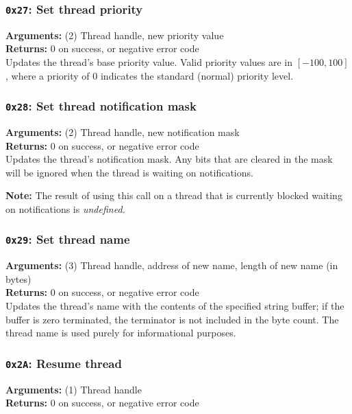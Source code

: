 \documentclass[11pt]{article}
\begin{document}
\subsubsection{{\tt 0x27}: Set thread priority}
\textbf{Arguments:} (2) Thread handle, new priority value \\
\textbf{Returns:} 0 on success, or negative error code \\

Updates the thread's base priority value. Valid priority values are in $[-100, 100]$, where a priority of $0$ indicates the standard (normal) priority level.

\subsubsection{{\tt 0x28}: Set thread notification mask}
\textbf{Arguments:} (2) Thread handle, new notification mask \\
\textbf{Returns:} 0 on success, or negative error code \\

Updates the thread's notification mask. Any bits that are cleared in the mask will be ignored when the thread is waiting on notifications.

\textbf{Note:} The result of using this call on a thread that is currently blocked waiting on notifications is \textit{undefined.}

\subsubsection{{\tt 0x29}: Set thread name}
\textbf{Arguments:} (3) Thread handle, address of new name, length of new name (in bytes) \\
\textbf{Returns:} 0 on success, or negative error code \\

Updates the thread's name with the contents of the specified string buffer; if the buffer is zero terminated, the terminator is not included in the byte count. The thread name is used purely for informational purposes. 

\subsubsection{{\tt 0x2A}: Resume thread}
\textbf{Arguments:} (1) Thread handle \\
\textbf{Returns:} 0 on success, or negative error code \\
\end{document}
